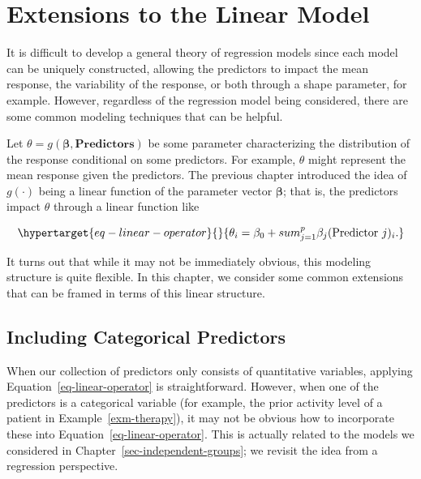 \documentclass[
  letterpaper,
  DIV=11,
  numbers=noendperiod]{scrreprt}
\theoremstyle{definition}
\theoremstyle{definition}
\theoremstyle{plain}
\theoremstyle{remark}
\begin{document}
\hypertarget{sec-reg-extensions}{%
\chapter{Extensions to the Linear Model}\label{sec-reg-extensions}}

\providecommand{\norm}[1]{\lVert#1\rVert}
\providecommand{\abs}[1]{\lvert#1\rvert}
\providecommand{\iid}{\stackrel{\text{IID}}{\sim}}
\providecommand{\ind}{\stackrel{\text{Ind}}{\sim}}

\providecommand{\bm}[1]{\mathbf{#1}}
\providecommand{\bs}[1]{\boldsymbol{#1}}
\providecommand{\bbeta}{\bs{\beta}}

\providecommand{\Ell}{\mathcal{L}}
\providecommand{\indep}{\perp\negthickspace\negmedspace\perp}

It is difficult to develop a general theory of regression models since
each model can be uniquely constructed, allowing the predictors to
impact the mean response, the variability of the response, or both
through a shape parameter, for example. However, regardless of the
regression model being considered, there are some common modeling
techniques that can be helpful.

Let \(\theta = g\left(\boldsymbol{\beta}, \mathbf{Predictors}\right)\)
be some parameter characterizing the distribution of the response
conditional on some predictors. For example, \(\theta\) might represent
the mean response given the predictors. The previous chapter introduced
the idea of \(g(\cdot)\) being a linear function of the parameter vector
\(\boldsymbol{\beta}\); that is, the predictors impact \(\theta\)
through a linear function like

\begin{equation}\protect\hypertarget{eq-linear-operator}{}{\theta_i = \beta_0 + sum_{j=1}^{p} \beta_j (\text{Predictor } j)_i.}\label{eq-linear-operator}\end{equation}

It turns out that while it may not be immediately obvious, this modeling
structure is quite flexible. In this chapter, we consider some common
extensions that can be framed in terms of this linear structure.

\hypertarget{including-categorical-predictors}{%
\section{Including Categorical
Predictors}\label{including-categorical-predictors}}

When our collection of predictors only consists of quantitative
variables, applying Equation~\ref{eq-linear-operator} is
straightforward. However, when one of the predictors is a categorical
variable (for example, the prior activity level of a patient in
Example~\ref{exm-therapy}), it may not be obvious how to incorporate
these into Equation~\ref{eq-linear-operator}. This is actually related
to the models we considered in Chapter~\ref{sec-independent-groups}; we
revisit the idea from a regression perspective.
\end{document}
